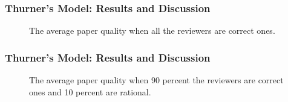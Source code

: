 \documentclass{beamer}
\begin{document}
\begin{frame}
\frametitle{Thurner's Model: Results and Discussion}
\begin{figure}
    \begin{center}
    \caption{The average paper quality when all the reviewers are correct ones.}
    \end{center}
\end{figure}
\end{frame}

\begin{frame}
\frametitle{Thurner's Model: Results and Discussion}
\begin{figure}
    \begin{center}
    \caption{The average paper quality when 90 percent the reviewers are correct ones and 10 percent are rational.}
    \end{center}
\end{figure}
\end{frame}
\end{document}
